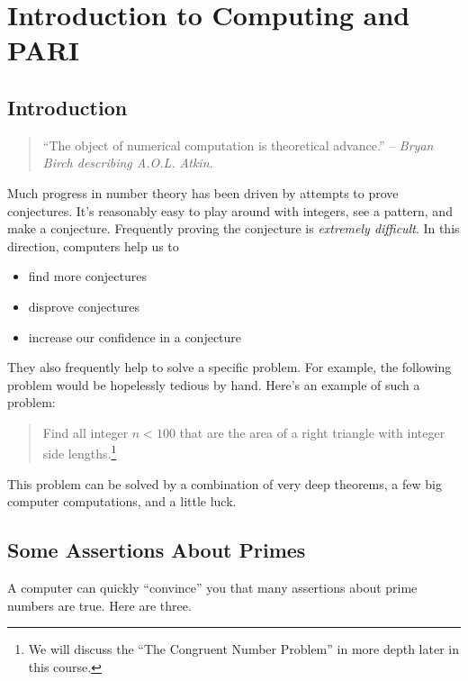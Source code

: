 \documentclass[11pt]{report}
\begin{document}
\chapter{Introduction to Computing and PARI}



\section{Introduction}
\begin{quote}
  ``The object of numerical computation is theoretical advance.''
  \hfill -- {\em Bryan Birch describing A.\thinspace{}O.\thinspace{}L. Atkin.}
\end{quote}

Much progress in number theory has been driven by attempts to prove
conjectures.  It's reasonably easy to play around with integers, see
a pattern, and make a conjecture.  Frequently proving the conjecture is
  {\em extremely difficult}.  In this direction, computers help us to
\begin{itemize}
  \item find more conjectures
  \item disprove conjectures
  \item increase our confidence in a conjecture
\end{itemize}
They also frequently help to solve a specific problem.
For example, the following problem would be hopelessly tedious
by hand.  Here's an example of such a problem:
\begin{quote}
  Find all integer $n<100$ that are the area of a right triangle with
  integer side lengths.\footnote{We will discuss the ``The Congruent
    Number Problem'' in more depth later in this course.}
\end{quote}
This problem can be solved by a combination of very deep theorems, a
few big computer computations, and a little luck.

\section{Some Assertions About Primes}
A computer can quickly ``convince'' you that many assertions
about prime numbers are true.  Here are three.
\end{document}
